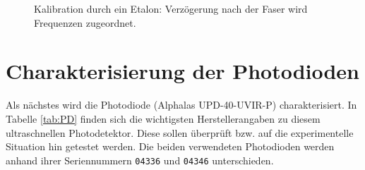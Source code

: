 \documentclass[bachelor,       %
               twoside,        %
               BCOR10mm,       %
               liststotoc,nomtotoc,bibtotoc, %
               english,ngerman, %
               final,          %
               ]{GAUBM}
\begin{document}
\begin{figure}[!htb]
   \centering
   \hfill
   \hfill
   \caption{Kalibration durch ein Etalon: Verzögerung nach der Faser wird Frequenzen zugeordnet.}
   \label{fig:caliEtalon}
\end{figure}

\section{Charakterisierung der Photodioden}
Als nächstes wird die Photodiode (Alphalas UPD-40-UVIR-P) charakterisiert.
In Tabelle \ref{tab:PD} finden sich die wichtigsten Herstellerangaben zu diesem ultraschnellen Photodetektor.
Diese sollen überprüft bzw. auf die experimentelle Situation hin getestet werden.
Die beiden verwendeten Photodioden werden anhand ihrer Seriennummern \texttt{04336} und \texttt{04346} unterschieden.
\end{document}
